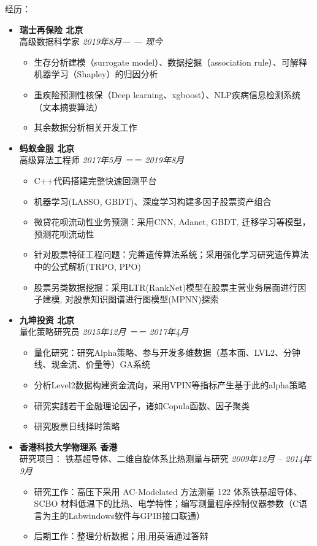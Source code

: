 \documentclass[a4paper,9pt,oneside]{scrartcl}
\newenvironment{ressection}[1]{
    \vspace{2pt}
    {\large#1}
    \begin{itemize}
    \vspace{2pt}
}{
    \end{itemize}
}
\newcommand{\ressubitem}[1]{
    \vspace{0pt}
    \item #1
}
\newcommand{\resbigitem}[3]{
    \vspace{-5pt}
    \item
    \textbf{#1}\\
    #2
    \textit{#3}
}
\newenvironment{ressubsec}[3]{
\resbigitem{#1}{#2}{#3}
    \vspace{-2pt}
    \begin{itemize}
}{
    \end{itemize}
}
\begin{document}
\begin{CJK*}{UTF8}{gbsn}
\begin{ressection}{经历：}
  \begin{ressubsec}{瑞士再保险 \hfill 北京}{高级数据科学家}{\hfill 2019年8月— — 现今}
	  \ressubitem{生存分析建模（surrogate model）、数据挖掘（association rule）、可解释机器学习（Shapley）的归因分析}
	  \ressubitem{重疾险预测性核保（Deep learning、xgboost）、NLP疾病信息检测系统（文本摘要算法）}
	  \ressubitem{其余数据分析相关开发工作}
  \end{ressubsec}
  \begin{ressubsec}{蚂蚁金服 \hfill 北京}{高级算法工程师}{\hfill 2017年5月 －－ 2019年8月}
	  \ressubitem{C++代码搭建完整快速回测平台}
	  \ressubitem{机器学习(LASSO, GBDT)、深度学习构建多因子股票资产组合}
	  \ressubitem{微贷花呗流动性业务预测：采用CNN, Adanet, GBDT, 迁移学习等模型，预测花呗流动性}
	  \ressubitem{针对股票特征工程问题：完善遗传算法系统；采用强化学习研究遗传算法中的公式解析(TRPO, PPO)}
	  \ressubitem{股票另类数据挖掘：采用LTR(RankNet)模型在股票主营业务层面进行因子建模, 对股票知识图谱进行图模型(MPNN)探索}
  \end{ressubsec}
  \begin{ressubsec}{九坤投资 \hfill 北京}{量化策略研究员}{\hfill 2015年12月 －－ 2017年4月}
    \ressubitem{量化研究：研究Alpha策略、参与开发多维数据（基本面、LVL2、分钟线、现金流、价量等）GA系统}
    \ressubitem{分析Level2数据构建资金流向，采用VPIN等指标产生基于此的alpha策略}
    \ressubitem{研究实践若干金融理论因子，诸如Copula函数、因子聚类}
	\ressubitem{研究股票日线择时策略}
  \end{ressubsec}
  \begin{ressubsec}{香港科技大学物理系 \hfill 香港}{研究项目：
    铁基超导体、二维自旋体系比热测量与研究}{\hfill  2009年12月 -- 2014年9月}
    \ressubitem{研究工作：高压下采用 AC-Modelated 方法测量 122 体系铁基超导体、SCBO
        材料低温下的比热、电学特性；编写测量程序控制仪器参数（C语言为主的Labwindows软件与GPIB接口联通）}
    \ressubitem{后期工作：整理分析数据；用;用英语通过答辩}
  \end{ressubsec}
\end{ressection}



\end{CJK*}
\end{document}
